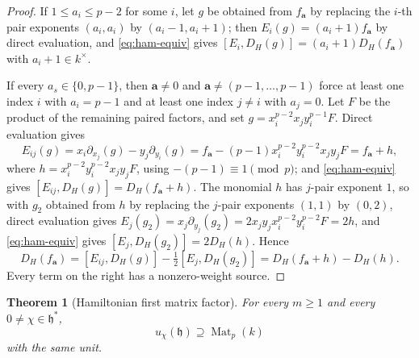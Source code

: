 \documentclass[11pt,reqno]{amsart}
\newtheorem{theorem}{Theorem}[section]
\theoremstyle{definition}
\theoremstyle{remark}
\theoremstyle{definition}
\newcommand{\Mat}{\operatorname{Mat}}
\begin{document}
\begin{proof}
If $1\le a_i\le p-2$ for some $i$, let $g$
be obtained from $f_{\mathbf a}$ by replacing the $i$-th pair exponents
$(a_i,a_i)$ by $(a_i-1,a_i+1)$; then $E_i(g)=(a_i+1)f_{\mathbf a}$ by direct
evaluation, and \eqref{eq:ham-equiv} gives
$[E_i,D_H(g)]=(a_i+1)D_H(f_{\mathbf a})$ with $a_i+1\in k^\times$.

If every $a_s\in\{0,p-1\}$, then $\mathbf a\ne0$ and $\mathbf a\ne
(p-1,\ldots,p-1)$ force at least one index $i$ with $a_i=p-1$ and at least
one index $j\ne i$ with $a_j=0$.  Let $F$ be the product of the remaining paired factors,
and set $g=x_i^{p-2}x_jy_i^{p-1}F$.  Direct evaluation gives
\[
 E_{ij}(g)=x_i\partial_{x_j}(g)-y_j\partial_{y_i}(g)
 =f_{\mathbf a}-(p-1)x_i^{p-2}y_i^{p-2}x_jy_jF
 =f_{\mathbf a}+h,
\]
where $h=x_i^{p-2}y_i^{p-2}x_jy_jF$, using $-(p-1)\equiv1\pmod p$; and
\eqref{eq:ham-equiv} gives $[E_{ij},D_H(g)]=D_H(f_{\mathbf a}+h)$.  The
monomial $h$ has $j$-pair exponent $1$, so with $g_2$ obtained from $h$ by
replacing the $j$-pair exponents $(1,1)$ by $(0,2)$, direct evaluation
gives $E_j(g_2)=x_j\partial_{y_j}(g_2)=2x_jy_jx_i^{p-2}y_i^{p-2}F=2h$, and
\eqref{eq:ham-equiv} gives $[E_j,D_H(g_2)]=2D_H(h)$.  Hence
\[
 D_H(f_{\mathbf a})
 =[E_{ij},D_H(g)]-\tfrac12[E_j,D_H(g_2)]
 =D_H(f_{\mathbf a}+h)-D_H(h).
\]
Every term on the right has a nonzero-weight source.
\end{proof}

\begin{theorem}[Hamiltonian first matrix factor]\label{thm:hamiltonian-first-matrix}
For every $m\ge1$ and every $0\ne\chi\in\mathfrak h^*$,
\[
 u_\chi(\mathfrak h)\supseteq\Mat_p(k)
\]
with the same unit.
\end{theorem}
\end{document}
